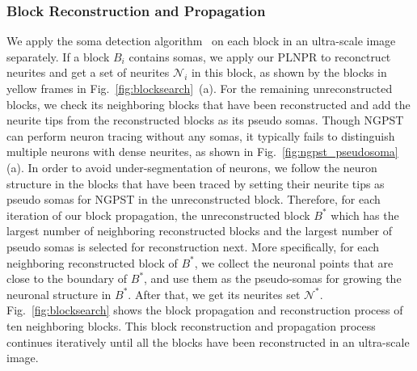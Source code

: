 
\subsubsection{Block Reconstruction and Propagation}
\label{sec:trace}


 
We apply the soma detection algorithm~\cite{Quan2013} on each block in an ultra-scale image separately. 
If a block $B_{i}$ contains somas, we apply our PLNPR to reconctruct neurites and get a set of neurites $\mathcal{N}_{i}$ in this block, as shown by the blocks in yellow frames in Fig.~\ref{fig:blocksearch}~(a).
For the remaining unreconstructed blocks, we check its neighboring blocks that have been reconstructed and add the neurite tips from the reconstructed blocks as its pseudo somas. 
%
Though NGPST can perform neuron tracing without any somas, it typically fails to distinguish multiple neurons with dense neurites, as shown in Fig.~\ref{fig:ngpst_pseudosoma}(a).
%
In order to avoid under-segmentation of neurons, we follow the neuron structure in the blocks that have been traced by setting their neurite tips as pseudo somas for NGPST in the unreconstructed block.
%
Therefore, for each iteration of our block propagation, the unreconstructed block $B^*$ which has the largest number of neighboring reconstructed blocks and the largest number of pseudo somas is selected for reconstruction next.
%
More specifically, for each neighboring reconstructed block of $B^*$, we collect the neuronal points that are close to the boundary of $B^*$, and use them as the pseudo-somas for growing the neuronal structure in $B^*$.
After that, we get its neurites set $ \mathcal{N}^*$.
Fig.~\ref{fig:blocksearch} shows the block propagation and reconstruction process of ten neighboring blocks. 
%
This block reconstruction and propagation process continues iteratively until all the blocks have been reconstructed in an ultra-scale image. 
%


